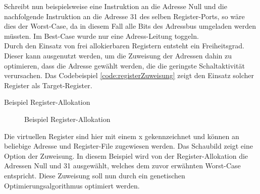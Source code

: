 Schreibt nun beispielsweise eine Instruktion an die Adresse Null und die nachfolgende Instruktion an die Adresse 31 des selben Register-Ports, so wäre dies der Worst-Case, da in diesem Fall alle Bits des Adressbus umgeladen werden müssten. Im Best-Case wurde nur eine Adress-Leitung toggeln.\\
Durch den Einsatz von frei allokierbaren Registern entsteht ein Freiheitsgrad. Dieser kann ausgenutzt werden, um die Zuweisung der Adressen dahin zu optimieren, dass die Adresse gewählt werden, die die geringste Schaltaktivität verursachen. Das Codebeispiel \ref{code:registerZuweisung} zeigt den Einsatz solcher Register als Target-Register. 
\begin{algorithm}[H]
	\begin{algorithmic}[1]
		\caption{Beispiel Register-Allokation}
		\label{code:registerZuweisung}
	\end{algorithmic}
\end{algorithm}

\begin{figure}[H] 
	\centering
	
	\caption{Beispiel Register-Allokation}
	\label{fig:register_aloc_example}
\end{figure}
Die virtuellen Register sind hier mit einem x gekennzeichnet und können an beliebige Adresse und Register-File zugewiesen werden. Das Schaubild zeigt eine Option der Zuweisung. In diesem Beispiel wird von der Register-Allokation die Adressen Null und 31 ausgewählt, welches dem zuvor erwähnten Worst-Case entspricht. Diese Zuweisung soll nun durch ein genetischen Optimierungsalgorithmus optimiert werden.\\

